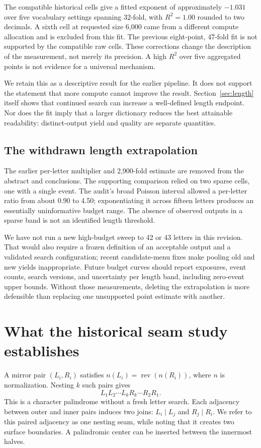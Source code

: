 \documentclass[11pt,letterpaper]{article}
\newcommand{\pageend}{\clearpage}
\begin{document}
The compatible historical cells give a fitted exponent of approximately $-1.031$ over five vocabulary settings spanning 32-fold, with $R^2=1.00$ rounded to two decimals. A sixth cell at requested size 6,000 came from a different compute allocation and is excluded from this fit. The previous eight-point, 47-fold fit is not supported by the compatible raw cells. These corrections change the description of the measurement, not merely its precision. A high $R^2$ over five aggregated points is not evidence for a universal mechanism.

We retain this as a descriptive result for the earlier pipeline. It does not support the statement that more compute cannot improve the result. Section~\ref{sec:length} itself shows that continued search can increase a well-defined length endpoint. Nor does the fit imply that a larger dictionary reduces the best attainable readability: distinct-output yield and quality are separate quantities.

\subsection*{The withdrawn length extrapolation}
The earlier per-letter multiplier and 2,900-fold estimate are removed from the abstract and conclusions. The supporting comparison relied on two sparse cells, one with a single event. The audit's broad Poisson interval allowed a per-letter ratio from about 0.90 to 4.50; exponentiating it across fifteen letters produces an essentially uninformative budget range. The absence of observed outputs in a sparse band is not an identified length threshold.

We have not run a new high-budget sweep to 42 or 43 letters in this revision. That would also require a frozen definition of an acceptable output and a validated search configuration; recent candidate-menu fixes make pooling old and new yields inappropriate. Future budget curves should report exposures, event counts, search versions, and uncertainty per length band, including zero-event upper bounds. Without those measurements, deleting the extrapolation is more defensible than replacing one unsupported point estimate with another.
\pageend

\section{What the historical seam study establishes}
\label{sec:oldseams}
A mirror pair $(L_i,R_i)$ satisfies $n(L_i)=\operatorname{rev}(n(R_i))$, where $n$ is normalization. Nesting $k$ such pairs gives
\[
 L_1L_2\cdots L_kR_k\cdots R_2R_1.
\]
This is a character palindrome without a fresh letter search. Each adjacency between outer and inner pairs induces two joins: $L_i\!\mid\!L_j$ and $R_j\!\mid\!R_i$. We refer to this paired adjacency as one nesting seam, while noting that it creates two surface boundaries. A palindromic center can be inserted between the innermost halves.
\end{document}
